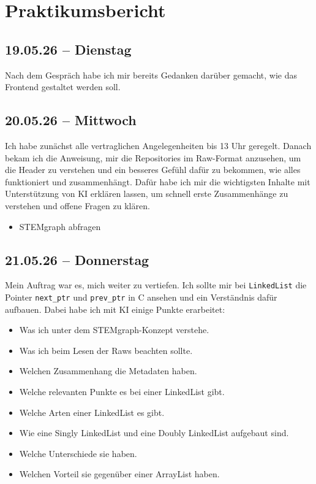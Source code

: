 
\vspace*{-2cm}

\section{Praktikumsbericht}

\subsection{19.05.26 -- Dienstag}

Nach dem Gespräch habe ich mir bereits Gedanken darüber gemacht, wie das Frontend gestaltet werden soll.

\subsection{20.05.26 -- Mittwoch}

Ich habe zunächst alle vertraglichen Angelegenheiten bis 13 Uhr geregelt. Danach bekam ich die Anweisung, mir die Repositories im Raw-Format anzusehen, um die Header zu verstehen und ein besseres Gefühl dafür zu bekommen, wie alles funktioniert und zusammenhängt.
Dafür habe ich mir die wichtigsten Inhalte mit Unterstützung von KI erklären lassen, um schnell erste Zusammenhänge zu verstehen und offene Fragen zu klären.

\begin{itemize}
    \item STEMgraph abfragen
\end{itemize}

\subsection{21.05.26 -- Donnerstag}

Mein Auftrag war es, mich weiter zu vertiefen. Ich sollte mir bei \texttt{LinkedList} die Pointer \texttt{next\_ptr} und \texttt{prev\_ptr} in C ansehen und ein Verständnis dafür aufbauen. Dabei habe ich mit KI einige Punkte erarbeitet:

\begin{itemize}
    \item Was ich unter dem STEMgraph-Konzept verstehe.
    \item Was ich beim Lesen der Raws beachten sollte.
    \item Welchen Zusammenhang die Metadaten haben.
    \item Welche relevanten Punkte es bei einer LinkedList gibt.
    \item Welche Arten einer LinkedList es gibt.
    \item Wie eine Singly LinkedList und eine Doubly LinkedList aufgebaut sind.
    \item Welche Unterschiede sie haben.
    \item Welchen Vorteil sie gegenüber einer ArrayList haben.
\end{itemize}

